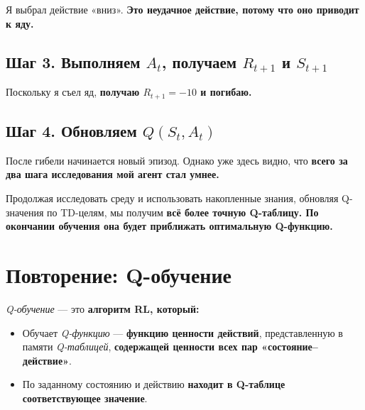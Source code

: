 \documentclass[11pt,a4paper]{article}
\begin{document}
Я выбрал действие «вниз». \textbf{Это неудачное действие, потому что оно приводит к яду.}


\subsection{\texorpdfstring{Шаг 3. Выполняем \(A_t\), получаем \(R_{t+1}\) и \(S_{t+1}\)}{Шаг 3. Выполняем At, получаем R(t+1) и S(t+1)}}\label{step-3-perform-action-at-get-rt1-and-st1-1}

Поскольку я съел яд, \textbf{получаю \(R_{t+1}=-10\) и погибаю.}


\subsection{\texorpdfstring{Шаг 4. Обновляем \(Q(S_t,A_t)\)}{Шаг 4. Обновляем Q(St,At)}}\label{step-4-update-qst-at-2}


После гибели начинается новый эпизод. Однако уже здесь видно, что \textbf{всего за два шага исследования мой агент стал умнее.}

Продолжая исследовать среду и использовать накопленные знания, обновляя Q-значения по TD-целям, мы получим \textbf{всё более точную Q-таблицу. По окончании обучения она будет приближать оптимальную Q-функцию.}

\section{Повторение: Q-обучение}\label{q-learning-recap}

\emph{Q-обучение} --- это \textbf{алгоритм RL, который:}

\begin{itemize}
\item
  Обучает \emph{Q-функцию} --- \textbf{функцию ценности действий}, представленную в памяти \emph{Q-таблицей}, \textbf{содержащей ценности всех пар «состояние--действие»}.
\item
  По заданному состоянию и действию \textbf{находит в Q-таблице соответствующее значение}.
\end{itemize}
\end{document}
